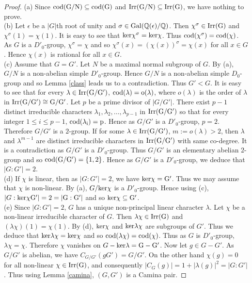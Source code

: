 \documentclass[12pt, oneside, a4paper]{article}
\theoremstyle{definition}
\begin{document}
\begin{proof}
(a) Since $\rm{cod}(G/N)\subseteq \rm{cod}(G)$ and $\rm{Irr}(G/N)\subseteq \rm{Irr}(G)$, we have nothing to prove.\\
(b) Let $\epsilon$ be a $|G|$th root of unity and $\sigma \in \rm{Gal}(\mathbb{Q}(\epsilon)/\mathbb{Q})$. Then $\chi^\sigma \in \rm{Irr}(G)$ and $\chi^\sigma (1)=\chi(1)$. It is easy to see that $\rm{ker}\chi^\sigma=\rm{ker}\chi$. Thus $\rm{cod}(\chi^\sigma)=\rm{cod}(\chi)$. As $G$ is a $D'_0$-group, $\chi^\sigma=\chi$ and so $\chi^\sigma (x)=(\chi(x))^\sigma=\chi(x)$ for all $x\in G$. Hence $\chi(x)$ is rational for all $x\in G$.\\
(c) Assume that $G=G'$. Let $N$ be a maximal normal subgroup of $G$. By (a), $G/N$ is a non-abelian simple $D'_0$-group. Hence $G/N$ is a non-abelian simple $D_0$-group and so Lemma \ref{class} leads us to a contradiction. Thus $G'<G$. It is easy to see that for every $\lambda \in \rm{Irr}(G/G')$, $\rm{cod}(\lambda)=o(\lambda)$, where $o(\lambda)$ is the order of $\lambda$ in $\rm{Irr}(G/G')\cong G/G'$.  Let $p$ be a prime divisor of $|G/G'|$. There exist $p-1$ distinct irreducible characters $\lambda_1, \lambda_2,\dots, \lambda_{p-1}$ in $\rm{Irr}(G/G')$ so that for every integer $1\leq i\leq p-1$, $\rm{cod}(\lambda_i)=p$. Hence as $G/G'$ is a $D'_0$-group, $p=2$. Therefore $G/G'$ is a $2$-group. If for some $\lambda \in \rm{Irr}(G/G')$, $m:=o(\lambda)>2$, then $\lambda$ and $\lambda^{m-1}$ are distinct irreducible characters in $\rm{Irr}(G/G')$ with same co-degree. It is a contradiction as $G/G'$ is a $D'_0$-group. Thus $G/G'$ is an elementary abelian $2$-group and so $\rm{cod}(G/G')=\{1,2\}$. Hence as $G/G'$ is a $D'_0$-group, we deduce that $|G:G'|=2$.\\
(d) If $\chi$ is linear, then as $|G:G'|=2$, we have $\rm{ker} \chi=G'$. Thus we may assume that $\chi$ is non-linear. By (a), $G/\rm{ker}\chi$ is a $D'_0$-group. Hence using (c), $|G:\rm{ker}\chi G'|=2=|G:G'|$ and so $\rm{ker} \chi\subseteq G'$.\\
(e) Since $|G:G'|=2$, $G$ has a unique non-principal linear character $\lambda$. Let $\chi$ be a non-linear irreducible character of $G$.
 Then $\lambda \chi \in \rm{Irr}(G)$ and $(\lambda \chi)(1)=\chi(1)$.
 By (d), $\rm{ker}\chi$ and $\rm{ker}\lambda\chi$ are subgroups of $G'$. Thus we deduce that $\rm{ker}\lambda\chi=\rm{ker}\chi$ and so $\rm{cod}(\lambda \chi)=\rm{cod}(\chi)$. Thus as $G$ is $D'_0$-group, $\lambda \chi=\chi$.
    Therefore $\chi$ vanishes on $G-\rm{ker}\lambda=G-G'$. Now let $g\in G-G'$.
     As $G/G'$ is abelian, we have $C_{G/G'}(gG')=G/G'$.
    On the other hand $\chi(g)=0$ for all non-linear $\chi\in \rm{Irr}(G)$, and consequently
$|C_G(g)|=1+|\lambda(g)|^2=|G:G'|$.
Thus using Lemma \ref{camina}, $(G,G')$ is a Camina pair.
\end{proof}
\end{document}
